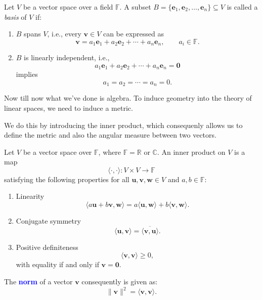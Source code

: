 \documentclass[10pt,a4paper]{article}
\begin{document}
\begin{definition}[Basis]
Let \(V\) be a vector space over a field \(\mathbb{F}\). A subset
\(B=\{\mathbf{e}_1,\mathbf{e}_2,\ldots,\mathbf{e}_n\}\subseteq V\)
is called a \emph{basis} of \(V\) if:

\begin{enumerate}
    \item \(B\) spans \(V\), i.e., every \(\mathbf{v}\in V\) can be
    expressed as
    \[
        \mathbf{v}
        =a_1\mathbf{e}_1+a_2\mathbf{e}_2
        +\cdots+a_n\mathbf{e}_n,
        \qquad a_i\in\mathbb{F}.
    \]

    \item \(B\) is linearly independent, i.e.,
    \[
        a_1\mathbf{e}_1+a_2\mathbf{e}_2
        +\cdots+a_n\mathbf{e}_n=\mathbf{0}
    \]
    implies
    \[
        a_1=a_2=\cdots=a_n=0.
    \]
\end{enumerate}
\end{definition}
Now till now what we've done is algebra. To induce geometry into the theory of linear spaces, we need to induce a metric.

We do this by introducing the inner product, which consequenly allows us to define the metric and also the angular measure between two vectors. 
\begin{definition}
Let \(V\) be a vector space over \(\mathbb{F}\), where
\(\mathbb{F}=\mathbb{R}\) or \(\mathbb{C}\). An inner product
on \(V\) is a map
\[
    \langle\cdot,\cdot\rangle:
    V\times V\longrightarrow\mathbb{F}
\]
satisfying the following properties for all
\(\mathbf{u},\mathbf{v},\mathbf{w}\in V\) and
\(a,b\in\mathbb{F}\):

\begin{enumerate}
    \item Linearity
    \[
        \langle a\mathbf{u}+b\mathbf{v},\mathbf{w}\rangle
        =
        a\langle\mathbf{u},\mathbf{w}\rangle
        +b\langle\mathbf{v},\mathbf{w}\rangle.
    \]

    \item Conjugate symmetry
    \[
        \langle\mathbf{u},\mathbf{v}\rangle
        =
        \overline{\langle\mathbf{v},\mathbf{u}\rangle}.
    \]

    \item Positive definiteness
    \[
        \langle\mathbf{v},\mathbf{v}\rangle\geq 0,
    \]
    with equality if and only if \(\mathbf{v}=\mathbf{0}\).
\end{enumerate}
\end{definition}
The \textbf{\textcolor{blue}{norm}} of a vector \(\mathbf v\) consequently is given as: 
\[\lVert \mathbf{v} \rVert^2 = \langle \mathbf{v},\mathbf{v} \rangle.
\]
\end{document}
